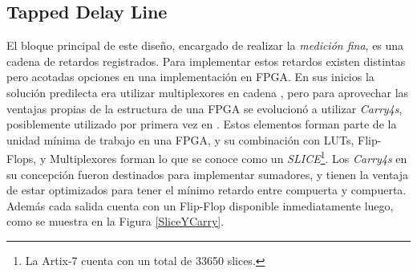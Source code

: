 \subsection{Tapped Delay Line}
El bloque principal de este diseño, encargado de realizar la \textit{medición fina}, es una cadena de retardos registrados.
Para implementar estos retardos existen distintas pero acotadas opciones en una implementación en FPGA. En sus
inicios la solución predilecta era utilizar multiplexores en cadena \cite{kalisz_field-programmable-gate-array-based_1997},
pero para aprovechar las ventajas propias de la estructura de una FPGA se evolucionó a utilizar
\textit{Carry4s}, posiblemente utilizado por primera vez en \cite{favi_17ps_2009}. Estos elementos
forman parte de la unidad mínima de trabajo en una FPGA, y su combinación con LUTs, Flip-Flops, y Multiplexores forman lo que 
se conoce como un \textit{SLICE}\footnote[1]{La Artix-7 cuenta con un total de 33650 slices.}. 
Los \textit{Carry4s} en su concepción fueron destinados para implementar sumadores, y tienen la ventaja de estar optimizados
para tener el mínimo retardo entre compuerta y compuerta. Además cada salida cuenta con un Flip-Flop disponible inmediatamente
luego, como se muestra en la Figura \ref{SliceYCarry}.


